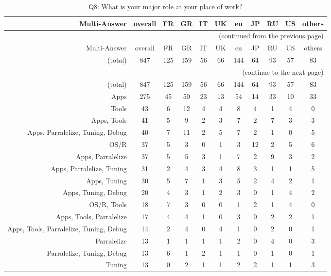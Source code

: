 \clearpage%
{\footnotesize\begin{landscape}%
\begin{longtable}[htb]{r|c|c|c|c|c|c|c|c|c|c}%
\caption{Q8: What is your major role at your place of work?}%
\label{tab:Q8-mans} \\%
\hline%
Multi-Answer & overall & FR & GR & IT & UK & eu & JP & RU & US & others \\
 \hline%
\endfirsthead%
\multicolumn{11}{r}{(continued from the previous page)}\\%
\hline%
Multi-Answer & overall & FR & GR & IT & UK & eu & JP & RU & US & others \\
 \hline%
\endhead%
\hline%
(total) & 847 & 125 & 159 & 56 & 66 & 144 & 64 & 93 & 57 & 83 \\%
\hline%
\multicolumn{11}{r}{(continue to the next page)}\\%
\endfoot%
\hline%
(total) & 847 & 125 & 159 & 56 & 66 & 144 & 64 & 93 & 57 & 83 \\%
\hline%
\endlastfoot%
\hline%
{Apps} & 275 & 45 & 50 & 23 & 13 & 54 & 14 & 33 & 10 & 33 \\%
{Tools} & 43 & 6 & 12 & 4 & 4 & 8 & 4 & 1 & 4 & 0 \\%
{Apps, Tools} & 41 & 5 & 9 & 2 & 3 & 7 & 2 & 7 & 3 & 3 \\%
{Apps, Parralelize, Tuning, Debug} & 40 & 7 & 11 & 2 & 5 & 7 & 2 & 1 & 0 & 5 \\%
{OS/R} & 37 & 5 & 3 & 0 & 1 & 3 & 12 & 2 & 5 & 6 \\%
{Apps, Parralelize} & 37 & 5 & 5 & 3 & 1 & 7 & 2 & 9 & 3 & 2 \\%
{Apps, Parralelize, Tuning} & 31 & 2 & 4 & 3 & 4 & 8 & 3 & 1 & 1 & 5 \\%
{Apps, Tuning} & 30 & 5 & 7 & 1 & 3 & 5 & 2 & 4 & 2 & 1 \\%
{Apps, Tuning, Debug} & 20 & 4 & 3 & 1 & 2 & 3 & 0 & 1 & 4 & 2 \\%
{OS/R, Tools} & 18 & 7 & 3 & 0 & 0 & 1 & 2 & 1 & 4 & 0 \\%
{Apps, Tools, Parralelize} & 17 & 4 & 4 & 1 & 0 & 3 & 0 & 2 & 2 & 1 \\%
{Apps, Tools, Parralelize, Tuning, Debug} & 14 & 2 & 4 & 0 & 4 & 1 & 0 & 2 & 0 & 1 \\%
{Parralelize} & 13 & 1 & 1 & 1 & 1 & 2 & 0 & 4 & 0 & 3 \\%
{Parralelize, Tuning, Debug} & 13 & 6 & 1 & 2 & 1 & 1 & 0 & 1 & 0 & 1 \\%
{Tuning} & 13 & 0 & 2 & 1 & 1 & 2 & 2 & 1 & 1 & 3 \\%

\end{longtable}
\end{landscape}}
